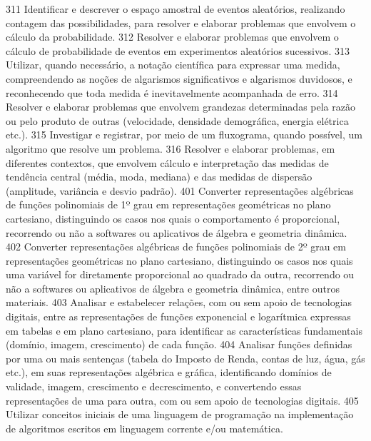 {{{			}{311}{%
				Identificar e descrever o espaço amostral de eventos aleatórios, realizando
				contagem das possibilidades, para resolver e elaborar problemas que envolvem o cálculo
				da probabilidade.
			}{312}{%
				Resolver e elaborar problemas que envolvem o cálculo de probabilidade
				de eventos em experimentos aleatórios sucessivos.
			}{313}{%
				Utilizar, quando necessário, a notação científica para expressar uma
				medida, compreendendo as noções de algarismos significativos e algarismos
				duvidosos,
				e reconhecendo que toda medida é inevitavelmente acompanhada de erro.
			}{314}{%
				Resolver e elaborar problemas que envolvem grandezas determinadas
				pela razão ou pelo produto de outras (velocidade, densidade demográfica, energia
				elétrica etc.).
			}{315}{%
				Investigar e registrar, por meio de um fluxograma, quando possível, um
				algoritmo que resolve um problema.
			}
			{316}{%
				Resolver e elaborar problemas, em diferentes contextos, que envolvem
				cálculo e interpretação das medidas de tendência central (média, moda, mediana) e das
				medidas de dispersão (amplitude, variância e desvio padrão).
			}
			{401}{%
				Converter representações algébricas de funções polinomiais de 1º grau
				em representações geométricas no plano cartesiano, distinguindo os casos nos quais o
				comportamento é proporcional, recorrendo ou não a softwares ou aplicativos de álgebra
				e geometria dinâmica.
			}
			{402}{%
				Converter representações algébricas de funções polinomiais de 2º grau
				em representações geométricas no plano cartesiano, distinguindo os casos nos quais
				uma variável for diretamente proporcional ao quadrado da outra, recorrendo ou não a
				softwares ou aplicativos de álgebra e geometria dinâmica, entre outros materiais.
			}
			{403}{%
				Analisar e estabelecer relações, com ou sem apoio de tecnologias
				digitais, entre as representações de funções exponencial e logarítmica expressas em
				tabelas e em plano cartesiano, para identificar as características fundamentais (domínio,
				imagem, crescimento) de cada função.
			}
			{404}{%
				Analisar funções definidas por uma ou mais sentenças (tabela do Imposto
				de Renda, contas de luz, água, gás etc.), em suas representações algébrica e gráfica,
				identificando domínios de validade, imagem, crescimento e decrescimento, e convertendo
				essas representações de uma para outra, com ou sem apoio de tecnologias digitais.
			}
			{405}{%
				Utilizar conceitos iniciais de uma linguagem de programação na
				implementação de algoritmos escritos em linguagem corrente e/ou matemática.
}}}
